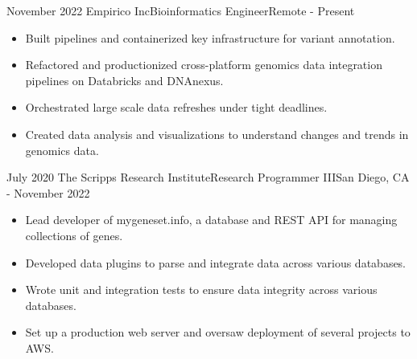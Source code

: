 %
%
%

\begin{experiences}
  \experience
    {November 2022} {Empirico Inc}{Bioinformatics Engineer}{Remote}
    {- Present} {
    \begin{itemize}
    \item Built pipelines and containerized key infrastructure for variant annotation.
    \item Refactored and productionized cross-platform genomics data integration pipelines on Databricks and DNAnexus.
    \item Orchestrated large scale data refreshes under tight deadlines.
    \item Created data analysis and visualizations to understand changes and trends in genomics data.
    \end{itemize}
    }

  \emptySeparator

  \experience
    {July 2020} {The Scripps Research Institute}{Research Programmer III}{San Diego, CA}
    {- November 2022} {
    \begin{itemize}
    \item Lead developer of mygeneset.info, a database and REST API for managing collections of genes.
    \item Developed data plugins to parse and integrate data across various databases.
    \item Wrote unit and integration tests to ensure data integrity across various databases.
    \item Set up a production web server and oversaw deployment of several projects to AWS.
    \end{itemize}
    }

  \emptySeparator


\end{experiences}
